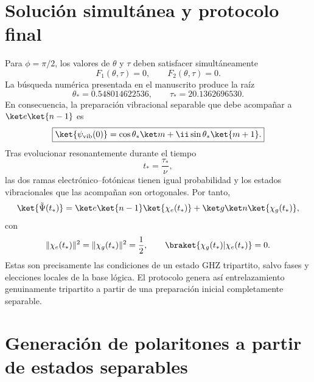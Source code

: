 \section{Soluci\'on simult\'anea y protocolo final}

Para $\phi=\pi/2$, los valores de $\theta$ y $\tau$ deben satisfacer
simult\'aneamente
\begin{equation}
  \boxed{
  F_1(\theta,\tau)=0,
  \qquad
  F_2(\theta,\tau)=0.
  }
\end{equation}
La b\'usqueda num\'erica presentada en el manuscrito produce la ra\'iz
\begin{equation}
  \boxed{
  \theta_*=0.548014622536,
  \qquad
  \tau_*=20.1362696530.
  }
\end{equation}
En consecuencia, la preparaci\'on vibracional separable que debe acompa\~nar a
$\ket e\ket{n-1}$ es
\begin{equation}
  \boxed{
  \ket{\psi_{\mathrm{vib}}(0)}
  =
  \cos\theta_*\ket m
  +\ii\sin\theta_*\ket{m+1}.
  }
\end{equation}
Tras evolucionar resonantemente durante el tiempo
\begin{equation}
  t_*=\frac{\tau_*}{\nu},
\end{equation}
las dos ramas electr\'onico--fot\'onicas tienen igual probabilidad y los
estados vibracionales que las acompa\~nan son ortogonales. Por tanto,
\begin{equation}
  \ket{\tilde\Psi(t_*)}
  =
  \ket e\ket{n-1}\ket{\chi_e(t_*)}
  +
  \ket g\ket n\ket{\chi_g(t_*)},
\end{equation}
con
\begin{equation}
  \|\chi_e(t_*)\|^2
  =
  \|\chi_g(t_*)\|^2
  =
  \frac12,
  \qquad
  \braket{\chi_g(t_*)|\chi_e(t_*)}=0.
\end{equation}
Estas son precisamente las condiciones de un estado GHZ tripartito, salvo
fases y elecciones locales de la base l\'ogica. El protocolo genera as\'i
entrelazamiento genuinamente tripartito a partir de una preparaci\'on inicial
completamente separable.

\section{Generaci\'on de polaritones a partir de estados separables}

